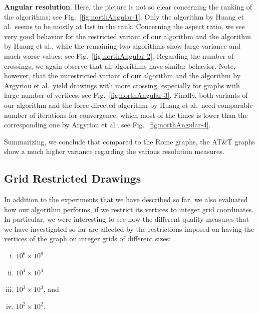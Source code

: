 \documentclass{comjnl}
\newcommand{\myparagraph}[1]{\medskip\noindent\textbf{#1}.}
\begin{document}
\myparagraph{Angular resolution} Here, the picture is not so clear concerning the ranking of the algorithms; see Fig.~\ref{fig:northAngular-1}. Only the algorithm by Huang et al.\ seems to be mostly at last in the rank. Concerning the aspect ratio, we see very good behavior for the restricted variant of our algorithm and the algorithm by Huang et al., while the remaining two algorithms show large variance and much worse values; see Fig.~\ref{fig:northAngular-2}. Regarding the number of crossings, we again observe that all algorithms have similar behavior. Note, however, that the unrestricted variant of our algorithm and the algorithm by Argyriou et al.\ yield drawings with more crossing, especially for graphs with large number of vertices; see Fig.~\ref{fig:northAngular-3}. Finally, both variants of our algorithm and the force-directed algorithm by Huang et al.\ need comparable number of iterations for convergence, which most of the times is lower than the corresponding one by Argyriou et al.; see Fig.~\ref{fig:northAngular-4}.

Summarizing, we conclude that compared to the Rome graphs, the AT\&T graphs show a much higher variance regarding the various resolution measures. %

\subsection{Grid Restricted Drawings}
\label{ssec:grid}

In addition to the experiments that we have described so far, we also evaluated how our algorithm performs, if we restrict its vertices to integer grid coordinates. In particular, we were interesting to see how the different quality measures that we have investigated so far are affected by the restrictions imposed on having the vertices of the graph on integer grids of different sizes:

\begin{enumerate}[(i)]
\item $10^6 \times 10^6$
\item $10^4 \times 10^4$
\item $10^3 \times 10^3$, and
\item $10^2 \times 10^2$.
\end{enumerate}
\end{document}
